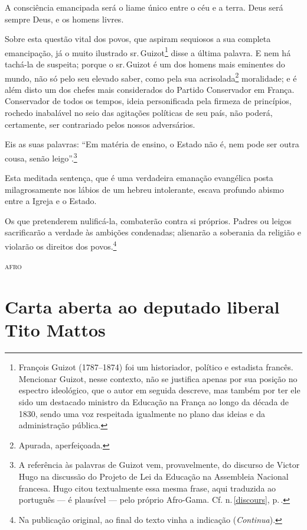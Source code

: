 A consciência emancipada será o liame único entre o céu e a terra. Deus
será sempre Deus, e os homens livres.

Sobre esta questão vital dos povos, que aspiram sequiosos a sua completa
emancipação, já o muito ilustrado sr.\,Guizot\footnote{François Guizot
  (1787--1874) foi um historiador, político e estadista francês.
  Mencionar Guizot, nesse contexto, não se justifica apenas por sua
  posição no espectro ideológico, que o autor em seguida descreve, mas
  também por ter ele sido um destacado ministro da Educação na França ao
  longo da década de 1830, sendo uma voz respeitada igualmente no plano
  das ideias e da administração pública.} disse a última palavra. E nem
há tachá-la de suspeita; porque o sr.\,Guizot é um dos homens mais
eminentes do mundo, não só pelo seu elevado saber, como pela sua
acrisolada\footnote{Apurada, aperfeiçoada.} moralidade; e é além disto
um dos chefes mais considerados do Partido Conservador em França.
Conservador de todos os tempos, ideia personificada pela firmeza de
princípios, rochedo inabalável no seio das agitações políticas de seu
país, não poderá, certamente, ser contrariado pelos nossos adversários.

Eis as suas palavras: ``Em matéria de ensino, o Estado não é, nem pode
ser outra cousa, senão leigo''.\footnote{A referência às palavras de
  Guizot vem, provavelmente, do discurso de Victor Hugo na discussão do
  Projeto de Lei da Educação na Assembleia Nacional francesa. Hugo citou
  textualmente essa mesma frase, aqui traduzida ao português --- é
  plausível --- pelo próprio Afro-Gama. Cf. n.\,\ref{discours}, p.\,\pageref{discours}.}

Esta meditada sentença, que é uma verdadeira emanação evangélica posta
milagrosamente nos lábios de um hebreu intolerante, escava profundo
abismo entre a Igreja e o Estado.

Os que pretenderem nulificá-la, combaterão contra si próprios. Padres ou
leigos sacrificarão a verdade às ambições condenadas; alienarão a
soberania da religião e violarão os direitos dos povos.\footnote{Na publicação original, ao final do texto vinha a indicação (\emph{Continua}).}

\begin{flushright}
\textsc{afro}
\end{flushright}

\part{Carta aberta ao deputado liberal Tito Mattos}

